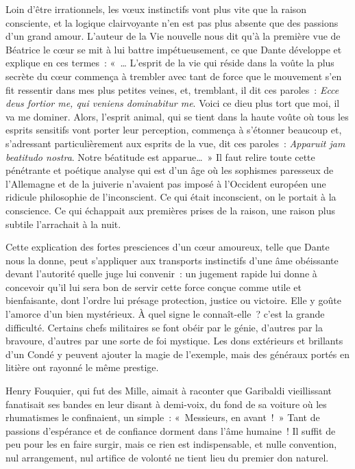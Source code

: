 \documentclass[french,twoside]{book} %
\begin{document}
\noindent Loin d’être irrationnels, les vœux instinctifs vont plus vite que la raison consciente, et la logique clairvoyante n’en est pas plus absente que des passions d’un grand amour. L’auteur de la Vie nouvelle nous dit qu’à la première vue de Béatrice le cœur se mit à lui battre impétueusement, ce que Dante développe et explique en ces termes : « … L’esprit de la vie qui réside dans la voûte la plus secrète du cœur commença à trembler avec tant de force que le mouvement s’en fit ressentir dans mes plus petites veines, et, tremblant, il dit ces paroles : \emph{Ecce deus fortior me, qui veniens dominabitur me}. Voici ce dieu plus tort que moi, il va me dominer. Alors, l’esprit animal, qui se tient dans la haute voûte où tous les esprits sensitifs vont porter leur perception, commença à s’étonner beaucoup et, s’adressant particulièrement aux esprits de la vue, dit ces paroles : \emph{Apparuit jam beatitudo nostra}. Notre béatitude est apparue… » Il faut relire toute cette pénétrante et poétique analyse qui est d’un âge où les sophismes paresseux de l’Allemagne et de la juiverie n’avaient pas imposé à l’Occident européen une ridicule philosophie de l’inconscient. Ce qui était inconscient, on le portait à la conscience. Ce qui échappait aux premières prises de la raison, une raison plus subtile l’arrachait à la nuit.\par
Cette explication des fortes presciences d’un cœur amoureux, telle que Dante nous la donne, peut s’appliquer aux transports instinctifs d’une âme obéissante devant l’autorité quelle juge lui convenir : un jugement rapide lui donne à concevoir qu’il lui sera bon de servir cette force conçue comme utile et bienfaisante, dont l’ordre lui présage protection, justice ou victoire. Elle y goûte l’amorce d’un bien mystérieux. À quel signe le connaît-elle ? c’est la grande difficulté. Certains chefs militaires se font obéir par le génie, d’autres par la bravoure, d’autres par une sorte de foi mystique. Les dons extérieurs et brillants d’un Condé y peuvent ajouter la magie de l’exemple, mais des généraux portés en litière ont rayonné le même prestige.\par
Henry Fouquier, qui fut des Mille, aimait à raconter que Garibaldi vieillissant fanatisait ses bandes en leur disant à demi-voix, du fond de sa voiture où les rhumatismes le confinaient, un simple : « Messieurs, en avant ! » Tant de passions d’espérance et de confiance dorment dans l’âme humaine ! Il suffit de peu pour les en faire surgir, mais ce rien est indispensable, et nulle convention, nul arrangement, nul artifice de volonté ne tient lieu du premier don naturel.\par
\end{document}
